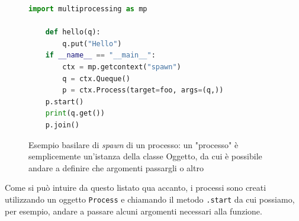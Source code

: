 \documentclass{report}
\begin{document}
\begin{figure}
	\begin{lstlisting}[language=Python]
	import multiprocessing as mp
	
	def hello(q):
		q.put("Hello")
	if __name__ == "__main__":
		ctx = mp.getcontext("spawn")
		q = ctx.Queque()
		p = ctx.Process(target=foo, args=(q,))
    p.start()
    print(q.get())
    p.join()
	\end{lstlisting}
\caption{Esempio basilare di \emph{spawn} di un processo: un "processo" è semplicemente un'istanza della classe Oggetto, da cui è possibile andare a definire che argomenti passargli o altro}
\end{figure}

\noindent Come si può intuire da questo listato qua accanto, i processi sono creati utilizzando un oggetto \texttt{Process} e chiamando il metodo \texttt{.start} da cui possiamo, per esempio, andare a passare alcuni argomenti necessari alla funzione. \\
 
\end{document}
